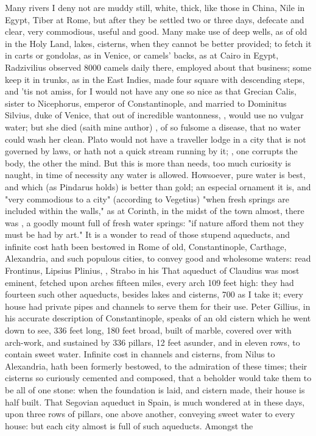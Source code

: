 {Many rivers I deny not are muddy still, white, thick, like those in China, Nile in Egypt, Tiber at Rome, but after they be settled two or three days, defecate and clear, very commodious, useful and good. Many make use of deep wells, as of old in the Holy Land, lakes, cisterns, when they cannot be better provided; to fetch it in carts or gondolas, as in Venice, or camels' backs, as at Cairo in Egypt, Radzivilius observed 8000 camels daily there, employed about that business; some keep it in trunks, as in the East Indies, made four square with descending steps, and 'tis not amiss, for I would not have any one so nice as that Grecian Calis, sister to Nicephorus, emperor of Constantinople, and married to Dominitus Silvius, duke of Venice, that out of incredible wantonness, , would use no vulgar water; but she died  (saith mine author) , of so fulsome a disease, that no water could wash her clean. Plato would not have a traveller lodge in a city that is not governed by laws, or hath not a quick stream running by it; , one corrupts the body, the other the mind. But this is more than needs, too much curiosity is naught, in time of necessity any water is allowed. Howsoever, pure water is best, and which (as Pindarus holds) is better than gold; an especial ornament it is, and "very commodious to a city" (according to Vegetius) "when fresh springs are included within the walls," as at Corinth, in the midst of the town almost, there was , a goodly mount full of fresh water springs: "if nature afford them not they must be had by art." It is a wonder to read of those stupend aqueducts, and infinite cost hath been bestowed in Rome of old, Constantinople, Carthage, Alexandria, and such populous cities, to convey good and wholesome waters: read Frontinus, Lipsius  Plinius, , Strabo in his  That aqueduct of Claudius was most eminent, fetched upon arches fifteen miles, every arch 109 feet high: they had fourteen such other aqueducts, besides lakes and cisterns, 700 as I take it; every house had private pipes and channels to serve them for their use. Peter Gillius, in his accurate description of Constantinople, speaks of an old cistern which he went down to see, 336 feet long, 180 feet broad, built of marble, covered over with arch-work, and sustained by 336 pillars, 12 feet asunder, and in eleven rows, to contain sweet water. Infinite cost in channels and cisterns, from Nilus to Alexandria, hath been formerly bestowed, to the admiration of these times; their cisterns so curiously cemented and composed, that a beholder would take them to be all of one stone: when the foundation is laid, and cistern made, their house is half built. That Segovian aqueduct in Spain, is much wondered at in these days, upon three rows of pillars, one above another, conveying sweet water to every house: but each city almost is full of such aqueducts. Amongst the }
